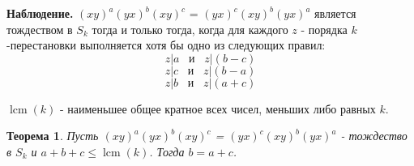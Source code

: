 \documentclass{article}
\newtheorem{theorem}{Теорема}
\DeclareMathOperator{\lcm}{lcm}
\begin{document}
	\textbf{Наблюдение.} $(xy)^a(yx)^b(xy)^c$ = $(yx)^c(xy)^b(yx)^a$ является тождеством в $S_k$ тогда и только тогда, когда для каждого $z$ - порядка $k$-перестановки выполняется хотя бы одно из следующих правил:
	\begin{equation}
		z|a \hspace{10pt} \text{и} \hspace{10pt} z|(b-c)
	\end{equation}
	\begin{equation}
		z|c \hspace{10pt} \text{и} \hspace{10pt} z|(b-a)
	\end{equation}
	\begin{equation}
		z|b \hspace{10pt} \text{и} \hspace{10pt} z|(a+c)
	\end{equation}

	$\lcm(k)$ - наименьшее общее кратное всех чисел, меньших либо равных $k$.

	\begin{theorem}
		Пусть $(xy)^a(yx)^b(xy)^c$ = $(yx)^c(xy)^b(yx)^a$ - тождество в $S_k$ и $a + b + c \le \lcm(k)$. Тогда $b = a+c$.
	\end{theorem}
\end{document}
